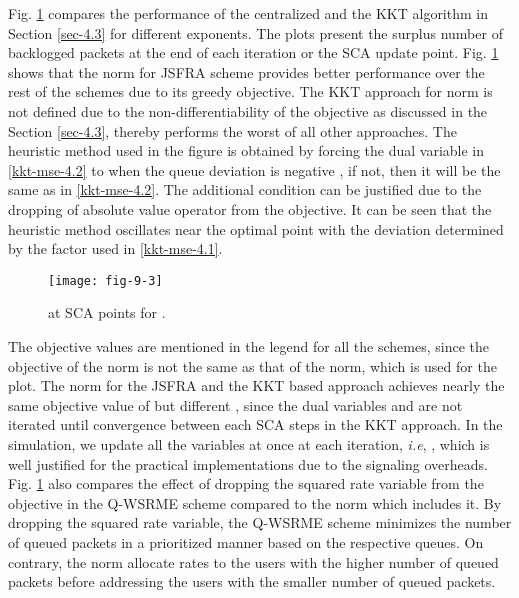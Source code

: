 Fig. \ref{fig-d-3.1} compares the performance of the centralized and the \ac{KKT} algorithm in Section \ref{sec-4.3} for different exponents. The plots present the surplus number of backlogged packets at the end of each iteration or the \ac{SCA} update point. Fig. \ref{fig-d-3.1} shows that the  norm for \ac{JSFRA} scheme provides better performance over the rest of the schemes due to its greedy objective. The \ac{KKT} approach for  norm is not defined due to the non-differentiability of the objective as discussed in the Section \ref{sec-4.3}, thereby performs the worst of all other approaches. The heuristic method used in the figure is obtained by forcing the dual variable  in \eqref{kkt-mse-4.2} to  when the queue deviation is negative , if not, then it will be the same as in \eqref{kkt-mse-4.2}. The additional condition can be justified due to the dropping of absolute value operator from the objective. It can be seen that the heuristic method oscillates near the optimal point with the deviation determined by the factor \me{\rho} used in \eqref{kkt-mse-4.1}.
\begin{figure}
	\centering
	\texttt{[image: fig-9-3]}
	\caption{\me{\chi} at \ac{SCA} points for .}
	\label{fig-d-3.1} \vspace{-0.15in}
\end{figure}

The objective values are mentioned in the legend for all the schemes, since the objective of the  norm is not the same as that of the  norm, which is used for the plot. The  norm for the \ac{JSFRA} and the \ac{KKT} based approach achieves nearly the same objective value of  but different \me{\chi}, since the dual variables  and  are not iterated until convergence between each \ac{SCA} steps in the \ac{KKT} approach. In the simulation, we update all the variables at once at each iteration, \textit{i.e}, , which is well justified for the practical implementations due to the signaling overheads. Fig. \ref{fig-d-3.1} also compares the effect of dropping the squared rate variable from the objective in the \ac{Q-WSRME} scheme compared to the  norm which includes it. By dropping the squared rate variable, the \ac{Q-WSRME} scheme minimizes the number of queued packets in a prioritized manner based on the respective queues. On contrary, the  norm allocate rates to the users with the higher number of queued packets before addressing the users with the smaller number of queued packets.


